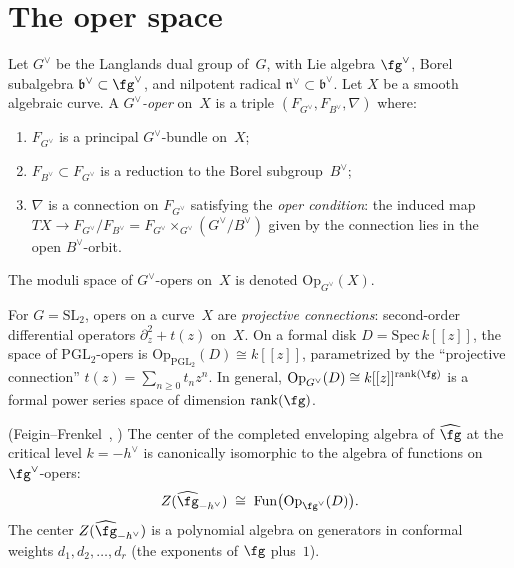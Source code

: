 \section{The oper space}
\label{sec:oper-space}

\begin{definition}
\label{def:opers}
Let $G^\vee$ be the Langlands dual group of~$G$, with
Lie algebra $\fg^\vee$, Borel subalgebra
$\mathfrak{b}^\vee \subset \fg^\vee$, and nilpotent radical
$\mathfrak{n}^\vee \subset \mathfrak{b}^\vee$. Let $X$ be a smooth algebraic
curve. A \emph{$G^\vee$-oper} on~$X$ is a triple
$(F_{G^\vee}, F_{B^\vee}, \nabla)$ where:
\begin{enumerate}[label=\textup{(\roman*)}]
\item $F_{G^\vee}$ is a principal $G^\vee$-bundle on~$X$;
\item $F_{B^\vee} \subset F_{G^\vee}$ is a reduction to the Borel
 subgroup~$B^\vee$;
\item $\nabla$ is a connection on $F_{G^\vee}$ satisfying the
 \emph{oper condition}: the induced map
 $TX \to F_{G^\vee}/F_{B^\vee} = F_{G^\vee} \times_{G^\vee} (G^\vee/B^\vee)$
 given by the connection lies in the open $B^\vee$-orbit.
\end{enumerate}
The moduli space of $G^\vee$-opers on~$X$ is denoted
$\mathrm{Op}_{G^\vee}(X)$.
\end{definition}

\begin{example}
\label{ex:sl2-opers}
For $G = \mathrm{SL}_2$, opers on a curve~$X$ are
\emph{projective connections}: second-order differential operators
$\partial_z^2 + t(z)$ on~$X$. On a formal disk $D = \mathrm{Spec}\, k[[z]]$, the space of
$\mathrm{PGL}_2$-opers is $\mathrm{Op}_{\mathrm{PGL}_2}(D) \cong k[[z]]$,
parametrized by the ``projective connection'' $t(z) = \sum_{n \geq 0} t_n z^n$.
In general, $\mathrm{Op}_{G^\vee}(D) \cong k[[z]]^{\mathrm{rank}(\fg)}$
is a formal power series space of dimension $\mathrm{rank}(\fg)$.
\end{example}

\begin{theorem}
\label{thm:ff-center-dl}
\textup{(}Feigin--Frenkel~\cite{Feigin-Frenkel},
\cite{FG06}\textup{)}\quad
The center of the completed enveloping algebra of
$\widehat{\fg}$ at the critical level $k = -h^\vee$ is
canonically isomorphic to the algebra of functions on
$\fg^\vee$-opers:
\begin{equation}\label{eq:ff-center}
Z(\widehat{\fg}_{-h^\vee})
\;\cong\;
\mathrm{Fun}\bigl(\mathrm{Op}_{\fg^\vee}(D)\bigr).
\end{equation}
The center $Z(\widehat{\fg}_{-h^\vee})$ is a polynomial
algebra on generators in conformal weights
$d_1, d_2, \ldots, d_r$ \textup{(}the exponents of $\fg$
plus~$1$\textup{)}.
\end{theorem}


